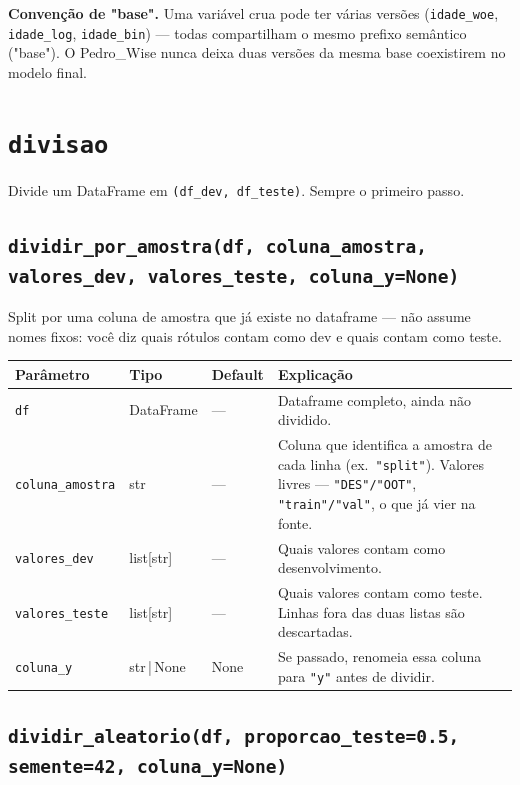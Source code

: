 \documentclass[11pt]{article}
\begin{document}
\textbf{Convenção de "base".} Uma variável crua pode ter várias versões
(\texttt{idade\_woe}, \texttt{idade\_log}, \texttt{idade\_bin}) --- todas
compartilham o mesmo prefixo semântico ("base"). O Pedro\_Wise nunca deixa
duas versões da mesma base coexistirem no modelo final.

\section{\texttt{divisao}}

Divide um DataFrame em \texttt{(df\_dev, df\_teste)}. Sempre o primeiro passo.

\subsection*{\texttt{dividir\_por\_amostra(df, coluna\_amostra, valores\_dev, valores\_teste, coluna\_y=None)}}

Split por uma coluna de amostra que já existe no dataframe --- não assume
nomes fixos: você diz quais rótulos contam como dev e quais contam como
teste.

\begin{longtable}{P{3.2cm}P{2cm}P{2cm}P{7.5cm}}
\toprule
\textbf{Parâmetro} & \textbf{Tipo} & \textbf{Default} & \textbf{Explicação} \\
\midrule
\endhead
\texttt{df} & DataFrame & --- & Dataframe completo, ainda não dividido. \\
\texttt{coluna\_amostra} & str & --- & Coluna que identifica a amostra de cada linha (ex.\ \texttt{"split"}). Valores livres --- \texttt{"DES"/"OOT"}, \texttt{"train"/"val"}, o que já vier na fonte. \\
\texttt{valores\_dev} & list[str] & --- & Quais valores contam como desenvolvimento. \\
\texttt{valores\_teste} & list[str] & --- & Quais valores contam como teste. Linhas fora das duas listas são descartadas. \\
\texttt{coluna\_y} & str\,|\,None & None & Se passado, renomeia essa coluna para \texttt{"y"} antes de dividir. \\
\bottomrule
\end{longtable}

\subsection*{\texttt{dividir\_aleatorio(df, proporcao\_teste=0.5, semente=42, coluna\_y=None)}}
\end{document}
